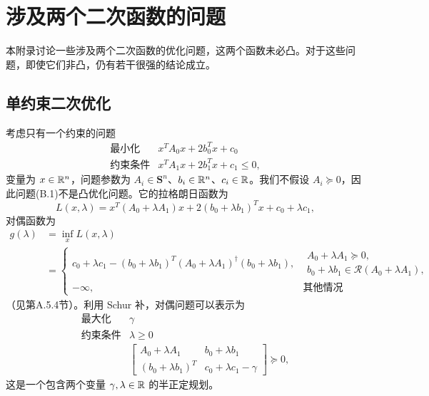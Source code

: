 \chapter{涉及两个二次函数的问题}
本附录讨论一些涉及两个二次函数的优化问题，这两个函数未必凸。对于这些问题，即使它们非凸，仍有若干很强的结论成立。

\section{单约束二次优化}
考虑只有一个约束的问题
\begin{equation}
\begin{array}{ll}
\text{最小化} & x^T A_0x+2b_0^Tx+c_0\\
\text{约束条件} & x^TA_1x+2b_1^Tx+c_1\leq0,
\end{array}\tag{B.1}
\end{equation}
变量为 $x\in\mathbb R^n$，问题参数为 $A_i\in\mathbf S^n$、$b_i\in\mathbb R^n$、$c_i\in\mathbb R$。我们不假设 $A_i\succeq0$，因此问题(B.1)不是凸优化问题。它的拉格朗日函数为
\[
 L(x,\lambda)=x^T(A_0+\lambda A_1)x+2(b_0+\lambda b_1)^Tx+c_0+\lambda c_1,
\]
对偶函数为
\begin{align*}
 g(\lambda)&=\inf_x L(x,\lambda)\\
 &=\begin{cases}
 c_0+\lambda c_1-(b_0+\lambda b_1)^T(A_0+\lambda A_1)^\dagger(b_0+\lambda b_1),
 &\begin{array}{l} A_0+\lambda A_1\succeq0,\\ b_0+\lambda b_1\in\mathcal R(A_0+\lambda A_1),\end{array}\\
 -\infty,&\text{其他情况}
 \end{cases}
\end{align*}
（见第A.5.4节）。利用 Schur 补，对偶问题可以表示为
\begin{equation}
 \begin{array}{ll}
 \text{最大化}&\gamma\\
 \text{约束条件}&\lambda\geq0\\[.3em]
 &\begin{bmatrix}A_0+\lambda A_1&b_0+\lambda b_1\\(b_0+\lambda b_1)^T&c_0+\lambda c_1-\gamma\end{bmatrix}\succeq0,
 \end{array}\tag{B.2}
\end{equation}
这是一个包含两个变量 $\gamma,\lambda\in\mathbb R$ 的半正定规划。

